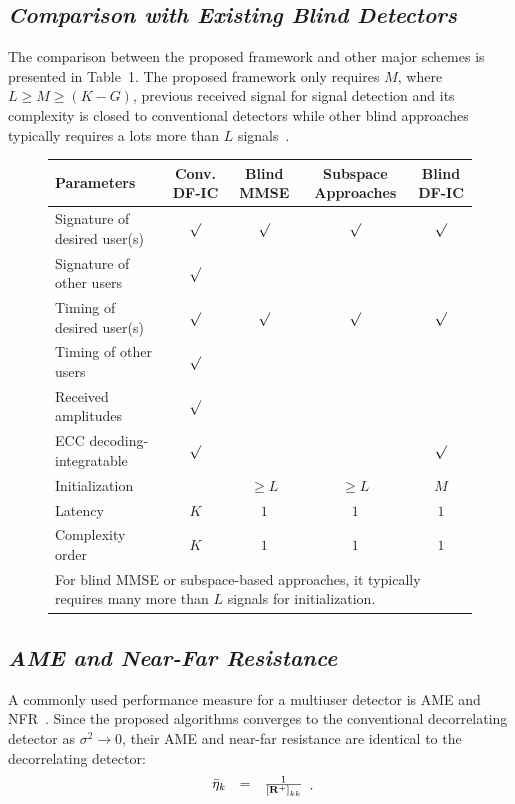 \documentclass[a4paper,10pt,fleqn, twocolumn]{IEEETran}
\newcommand{\bR}{{\bf R}}
\begin{document}
\subsection{\em Comparison with Existing Blind Detectors}
The comparison between the proposed framework and other major
schemes is presented in Table~1. The proposed framework only
requires $M$, where $L\ge M\ge (K-G)$, previous received signal
for signal detection and its complexity is closed to conventional
detectors while other blind approaches typically requires a lots
more than $L$ signals~\cite{Madh94,Wang98,Zhang02}.
\begin{figure}[t]\label{SchemComp}
\begin{center}
\begin{tabular}{lcccc}
Parameters & Conv. DF-IC & Blind MMSE & Subspace Approaches & Blind DF-IC\\
\hline
\hline
Signature of desired user(s) & $\mathbf\surd$ & $\mathbf\surd$ &  $\mathbf\surd$ & $\mathbf\surd$ \\
Signature of other users & $\mathbf\surd$ & &  \\
Timing of desired user(s)  & $\mathbf\surd$ & $\mathbf\surd$ & $\mathbf\surd$ & $\mathbf\surd$ \\
Timing of other users  & $\mathbf\surd$ & & & \\
Received amplitudes  & $\mathbf\surd$ & &  &\\
ECC decoding-integratable& $\mathbf\surd$ &&& $\mathbf\surd$ \\
Initialization~{\small *} &  & $\ge L$ & $\ge L$ & $M$\\
Latency & $K$ & $1$ & $1$ & $1$ \\
Complexity order & $K$ & $1$ & $1$ & $1$ \\
\hline \hline \multicolumn{5}{l}{\small * For blind MMSE or
subspace-based approaches, it typically requires many more than
$L$ signals for initialization.}
\end{tabular}
\end{center}
\end{figure}

\subsection{\em AME and Near-Far Resistance}
A commonly used performance measure for a multiuser detector is
AME and NFR~\cite{Verd98}. Since the proposed algorithms converges
to the conventional decorrelating detector as $\sigma^2\rightarrow
0$, their AME and near-far resistance are identical to the
decorrelating detector:
\begin{equation}
\begin{array}{rcl}
\bar{\eta}_k&=&\frac{1}{\left[\bR^{+}\right]_{kk}}
\end{array}.
\end{equation}
\end{document}
